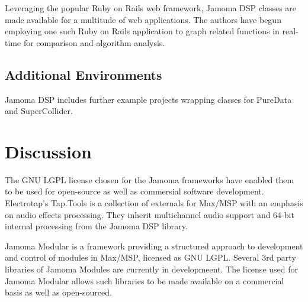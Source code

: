\documentclass[twoside,10pt]{article}
\begin{document}
Leveraging the popular Ruby on Rails web framework, Jamoma DSP classes are made available for a multitude of web applications.  The authors have begun employing one such Ruby on Rails application to graph related functions in real-time for comparison and algorithm analysis.


\subsection{Additional Environments}

Jamoma DSP includes further example projects wrapping classes for PureData and SuperCollider.




\section{Discussion} %




The GNU LGPL license chosen for the Jamoma frameworks have enabled them to be used for open-source as well as commersial software development.  Electrotap's Tap.Tools\cite{web17} is a collection of externals for Max/MSP with an emphasis on audio effects processing.  They inherit multichannel audio support and 64-bit internal processing from the Jamoma DSP library.

Jamoma Modular \cite{Place:2006} is a framework providing a structured approach to development and control of modules in Max/MSP, licensed as GNU LGPL. Several 3rd party libraries of Jamoma Modules are currently in developmeent. The license used for Jamoma Modular allows such libraries to be made available on a commercial basis as well as open-sourced.
\end{document}
